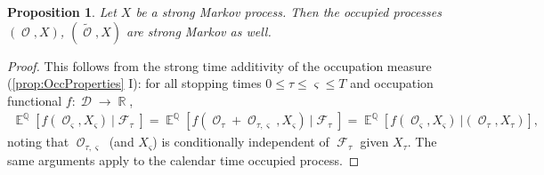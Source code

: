\documentclass[10pt,a4paper]{amsart}
\newtheorem{proposition}{Proposition}
\DeclareMathOperator{\E}{\mathbb{E}}
\DeclareMathOperator{\Q}{\mathbb{Q}}
\DeclareMathOperator{\R}{\mathbb{R}}
\DeclareMathOperator{\calD}{\mathcal{D}}
\DeclareMathOperator{\calF}{\mathcal{F}}
\DeclareMathOperator{\calO}{\mathcal{O}}
\begin{document}
\begin{proposition}\label{prop:Markov}
Let $X$ be a strong Markov process. Then the occupied processes $(\calO,X)$,  $(\tilde{\calO},X)$ are  strong Markov as well. 
\end{proposition}

\begin{proof}
This follows from 
the strong time additivity  of the occupation measure (\cref{prop:OccProperties} I): for  
all stopping times $0\le \tau\le \varsigma \le T$ and occupation functional   $f:\calD \to \R$, \begin{align*}
    \E^{\Q}[f(\calO_{\varsigma},X_{\varsigma}) \ |  \calF_{\tau}]
    =  
    \E^{\Q}[f(\calO_{\tau}+\calO_{\tau,\varsigma},X_{\varsigma}) \ |   \calF_{\tau}]
     = \E^{\Q}[f(\calO_{\varsigma},X_{\varsigma}) \ |  (\calO_\tau,X_\tau)], 
\end{align*} 
noting that  $\calO_{\tau,\varsigma}$ (and $X_{\varsigma}$) is conditionally independent of $\calF_{\tau}$ given $X_{\tau}$. The same arguments apply to the calendar time occupied process. 
\end{proof}
\end{document}
